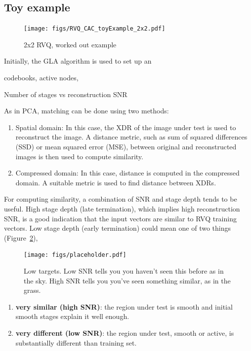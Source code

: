 \documentclass[12pt,letterpaper,doublespaced,ETD]{gt-ece-thesis} %
\begin{document}
\begin{Body}
\section{Toy example}
\begin{figure}[htp!]
\centering
\texttt{[image: figs/RVQ\_CAC\_toyExample\_2x2.pdf]}
\caption{2x2 RVQ, worked out example}
\label{fig:HMM}
\end{figure}


Initially, the GLA algorithm is used to set up an

codebooks, active nodes, 

Number of stages vs reconstruction SNR 

As in PCA, matching can be done using two methods:

\begin{enumerate}
	\item Spatial domain: In this case, the XDR of the image under test is used to reconstruct the image.  A distance metric, such as sum of squared differences (SSD) or mean squared error (MSE), between original and reconstructed images is then used to compute similarity.
	\item Compressed domain: In this case, distance is computed in the compressed domain.  A suitable metric is used to find distance between XDRs.  
\end{enumerate}

For computing similarity, a combination of SNR and stage depth tends to be useful.    High stage depth (late termination), which implies high reconstruction SNR, is a good indication that the input vectors are similar to RVQ training vectors.  Low stage depth (early termination) could mean one of two things (Figure~\ref{fig:lowStages}),

	\begin{figure}[h]
		\centering
		\texttt{[image: figs/placeholder.pdf]}
		\caption{Low targets.  Low SNR tells you you haven't seen this before as in the sky.  High SNR tells you you've seen something similar, as in the grass.}
		\label{fig:lowStages}
	\end{figure}

	\begin{enumerate}
		\item \textbf{very similar (high SNR)}: the region under test is smooth and initial smooth stages explain it well enough.
		\item \textbf{very different (low SNR)}: the region under test, smooth or active, is substantially different than training set.
	\end{enumerate}




\end{Body}
\end{document}
